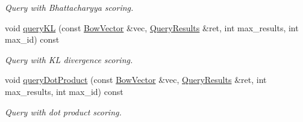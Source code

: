 \begin{DoxyCompactItemize}
\begin{DoxyCompactList}\small\item\em Query with Bhattacharyya scoring. \end{DoxyCompactList}\item 
\mbox{\label{classDBoW2_1_1TemplatedDatabase_a8bbb3e83e33dc2a047c8d733bd58b17c}} 
void \hyperlink{classDBoW2_1_1TemplatedDatabase_a8bbb3e83e33dc2a047c8d733bd58b17c}{query\+KL} (const \hyperlink{classDBoW2_1_1BowVector}{Bow\+Vector} \&vec, \hyperlink{classDBoW2_1_1QueryResults}{Query\+Results} \&ret, int max\+\_\+results, int max\+\_\+id) const
\begin{DoxyCompactList}\small\item\em Query with KL divergence scoring. \end{DoxyCompactList}\item 
\mbox{\label{classDBoW2_1_1TemplatedDatabase_aae437bbd6ce1b4f9bbfc401d26bd2c4e}} 
void \hyperlink{classDBoW2_1_1TemplatedDatabase_aae437bbd6ce1b4f9bbfc401d26bd2c4e}{query\+Dot\+Product} (const \hyperlink{classDBoW2_1_1BowVector}{Bow\+Vector} \&vec, \hyperlink{classDBoW2_1_1QueryResults}{Query\+Results} \&ret, int max\+\_\+results, int max\+\_\+id) const
\begin{DoxyCompactList}\small\item\em Query with dot product scoring. \end{DoxyCompactList}\end{DoxyCompactItemize}
